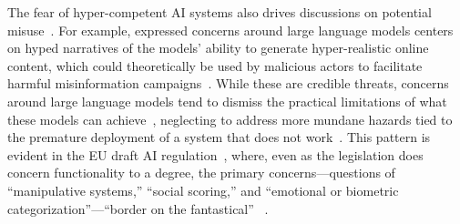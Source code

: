\documentclass[acmconf,manuscript,screen,natbib=true]{acmart}
\begin{document}

The fear of hyper-competent AI systems also drives discussions on potential misuse~\cite{brundage2018malicious}. For example, expressed concerns around large language models %
centers on hyped narratives of the models' ability to generate hyper-realistic online content, which could theoretically be used by malicious actors to facilitate harmful misinformation campaigns~\cite{llmdeepmind, llmopenai}. 
While these are credible threats, concerns around large language models tend to dismiss the practical limitations of what these models can achieve~\cite{bender2021dangers}, %
neglecting to address more mundane hazards tied to the premature deployment of a system that does not work~\cite{ettinger2020bert, goog_search_fail}. 
This pattern is evident in the EU draft AI regulation~\cite{AI_Act}, where, even as the legislation does concern functionality to a degree, the primary concerns---questions of ``manipulative systems,'' ``social scoring,'' and ``emotional or biometric categorization''---``border on the fantastical''
~\cite[p.~98]{veale_euact}. %
\end{document}
